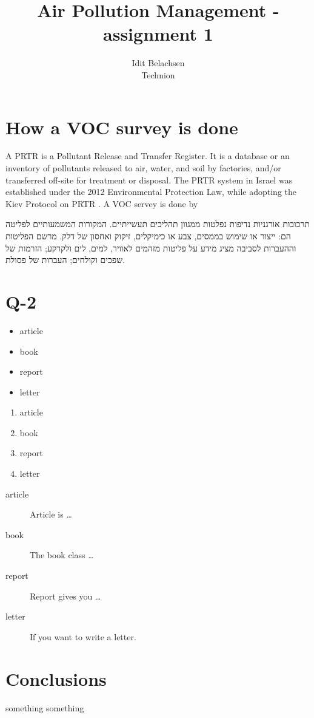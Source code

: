 \documentclass[a4paper,fontsize=12pt]{article}
\title{Air Pollution Management - assignment 1}
\author{Idit Belachsen  \\ Technion  \\}
\begin{document}
	\maketitle
	
	\section{How a VOC survey is done}
	A PRTR is a Pollutant Release and Transfer Register. It is a database or an inventory of pollutants released to air, water, and soil by factories, and/or transferred off-site for treatment or disposal. The PRTR system in Israel was established under the 2012 Environmental Protection Law, while adopting the Kiev Protocol on PRTR \cite{IsraelMinistryEnvProt}. 
	\newline
	\newline
	A VOC servey is done by 
	\newline

תרכובות אורגניות נדיפות נפלטות ממגוון תהליכים תעשייתיים. המקורות המשמעותיים לפליטה הם: ייצור או שימוש בממסים, צבע או כימיקלים, זיקוק ואחסון של דלק. מרשם הפליטות וההעברות לסביבה מציג מידע על פליטות מזהמים לאוויר, למים, לים ולקרקע; הזרמות של שפכים וקולחים; העברות של פסולת. 

	
	\section{Q-2} \label{documentclasses}
	
	\begin{itemize}
		\item article
		\item book 
		\item report 
		\item letter 
	\end{itemize}
	
	
	\begin{enumerate}
		\item article
		\item book 
		\item report 
		\item letter 
	\end{enumerate}
	
	\begin{description}
		\item[article\label{article}]{Article is \ldots}
		\item[book\label{book}]{The book class \ldots}
		\item[report\label{report}]{Report gives you \ldots}
		\item[letter\label{letter}]{If you want to write a letter.}
	\end{description}
	
	
	\section{Conclusions}\label{conclusions}
	
	something something \cite{Lerner2015}
	
	
	
\end{document}
